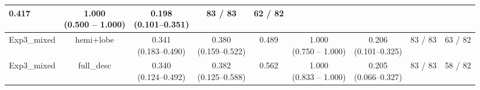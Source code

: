 \documentclass[a4paper,12pt]{article}
\begin{document}
\begin{table}[ht]
\begin{tabular}{lcccccccc}
0.417 &
\makecell{1.000 \\ (0.500 -- 1.000)}&
\makecell{0.198 \\ (0.101--0.351)} &
83 / 83&
\colorbox{blue!20}{62 / 82} \\
\hline
Exp3\_mixed & 
hemi+lobe &
\makecell{\colorbox{orange!20}{0.341} \\ (0.183--0.490)} &
\makecell{\colorbox{orange!20}{0.380} \\ (0.159--0.522)} &
0.489 &
\makecell{1.000 \\ (0.750 -- 1.000)}&
\makecell{\colorbox{orange!20}{0.206} \\ (0.101--0.325)} &
83 / 83 &
\colorbox{green!20}{63 / 82} \\
\hline
Exp3\_mixed & 
full\_desc &
\makecell{0.340 \\ (0.124--0.492)} &
\makecell{\colorbox{blue!20}{0.382} \\ (0.125--0.588)} &
\colorbox{blue!20}{0.562} &
\makecell{1.000 \\ (0.833 -- 1.000)}&
\makecell{0.205 \\ (0.066--0.327)} &
83 / 83&
58 / 82 \\

\hline
\end{tabular}
\end{table}
\end{document}
